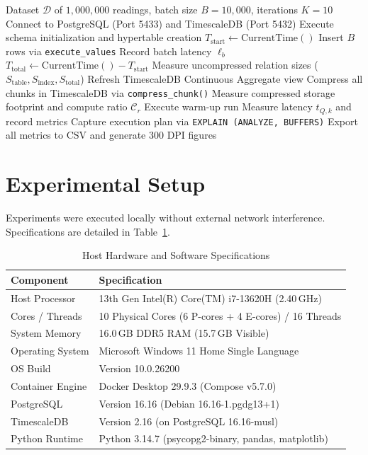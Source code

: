 \documentclass[conference,a4paper]{IEEEtran}
\begin{document}
\begin{algorithm}[h]
\caption{End-to-End IoT Benchmarking Workflow}
\label{alg:bench}
\begin{algorithmic}[1]
\REQUIRE Dataset $\mathcal{D}$ of $1,000,000$ readings, batch size $B=10,000$, iterations $K=10$
\STATE Connect to PostgreSQL (Port 5433) and TimescaleDB (Port 5432)
\STATE Execute schema initialization and hypertable creation
    \STATE $T_{\text{start}} \leftarrow \text{CurrentTime}()$
        \STATE Insert $B$ rows via \texttt{execute\_values}
        \STATE Record batch latency $\ell_b$
    \ENDFOR
    \STATE $T_{\text{total}} \leftarrow \text{CurrentTime}() - T_{\text{start}}$
    \STATE Measure uncompressed relation sizes ($S_{\text{table}}, S_{\text{index}}, S_{\text{total}}$)
\ENDFOR
\STATE Refresh TimescaleDB Continuous Aggregate view
\STATE Compress all chunks in TimescaleDB via \texttt{compress\_chunk()}
\STATE Measure compressed storage footprint and compute ratio $\mathcal{C}_r$
    \STATE Execute warm-up run
        \STATE Measure latency $t_{Q, k}$ and record metrics
    \ENDFOR
    \STATE Capture execution plan via \texttt{EXPLAIN (ANALYZE, BUFFERS)}
\ENDFOR
\STATE Export all metrics to CSV and generate 300 DPI figures
\end{algorithmic}
\end{algorithm}

\section{Experimental Setup}
Experiments were executed locally without external network interference. Specifications are detailed in Table~\ref{tab:hardware}.

\begin{table}[h]
\centering
\caption{Host Hardware and Software Specifications}
\label{tab:hardware}
\footnotesize
\begin{tabular}{@{}ll@{}}
\toprule
\textbf{Component} & \textbf{Specification} \\
\midrule
Host Processor & 13th Gen Intel(R) Core(TM) i7-13620H (2.40\,GHz) \\
Cores / Threads & 10 Physical Cores (6 P-cores + 4 E-cores) / 16 Threads \\
System Memory & 16.0\,GB DDR5 RAM (15.7\,GB Visible) \\
Operating System & Microsoft Windows 11 Home Single Language \\
OS Build & Version 10.0.26200 \\
Container Engine & Docker Desktop 29.9.3 (Compose v5.7.0) \\
PostgreSQL & Version 16.16 (Debian 16.16-1.pgdg13+1) \\
TimescaleDB & Version 2.16 (on PostgreSQL 16.16-musl) \\
Python Runtime & Python 3.14.7 (psycopg2-binary, pandas, matplotlib) \\
\bottomrule
\end{tabular}
\end{table}
\end{document}
